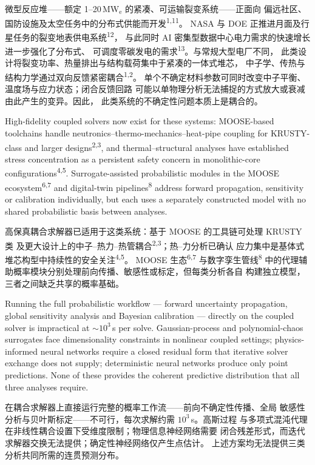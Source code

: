 \documentclass[11pt,a4paper]{article}
\begin{document}
微型反应堆——额定 1--20\,MW$_\mathrm{e}$ 的紧凑、可运输裂变系统——正面向
偏远社区、国防设施及太空任务中的分布式供能而开发\textsuperscript{1,11}。
NASA 与 DOE 正推进月面及行星任务的裂变地表供电系统\textsuperscript{12}，
与此同时 AI 密集型数据中心电力需求的快速增长进一步强化了分布式、
可调度零碳发电的需求\textsuperscript{13}。与常规大型电厂不同，
此类设计将裂变功率、热量排出与结构载荷集中于紧凑的一体式堆芯，
中子学、传热与结构力学通过双向反馈紧密耦合\textsuperscript{1,2}。
单个不确定材料参数可同时改变中子平衡、温度场与应力状态；闭合反馈回路
可能以单物理分析无法捕捉的方式放大或衰减由此产生的变异。因此，
此类系统的不确定性问题本质上是耦合的。

High-fidelity coupled solvers now exist for these systems: MOOSE-based
toolchains handle neutronics--thermo-mechanics--heat-pipe coupling for
KRUSTY-class and larger designs\textsuperscript{2,3}, and thermal--structural
analyses have established stress concentration as a persistent safety
concern in monolithic-core configurations\textsuperscript{4,5}.
Surrogate-assisted probabilistic modules in the MOOSE
ecosystem\textsuperscript{6,7} and digital-twin
pipelines\textsuperscript{8} address forward propagation, sensitivity or
calibration individually, but each uses a separately constructed model
with no shared probabilistic basis between analyses.

高保真耦合求解器已适用于这类系统：基于 MOOSE 的工具链可处理 KRUSTY 类
及更大设计上的中子--热力--热管耦合\textsuperscript{2,3}；热--力分析已确认
应力集中是基体式堆芯构型中持续性的安全关注\textsuperscript{4,5}。
MOOSE 生态\textsuperscript{6,7} 与数字孪生管线\textsuperscript{8}
中的代理辅助概率模块分别处理前向传播、敏感性或标定，但每类分析各自
构建独立模型，三者之间缺乏共享的概率基础。

Running the full probabilistic workflow --- forward uncertainty
propagation, global sensitivity analysis and Bayesian calibration ---
directly on the coupled solver is impractical at ${\sim}10^{3}$\,s per
solve. Gaussian-process and polynomial-chaos surrogates face
dimensionality constraints in nonlinear coupled settings;
physics-informed neural networks require a closed residual form that
iterative solver exchange does not supply; deterministic neural networks
produce only point predictions. None of these provides the coherent
predictive distribution that all three analyses require.

在耦合求解器上直接运行完整的概率工作流——前向不确定性传播、全局
敏感性分析与贝叶斯标定——不可行，每次求解约需 $10^{3}$\,s。高斯过程
与多项式混沌代理在非线性耦合设置下受维度限制；物理信息神经网络需要
闭合残差形式，而迭代求解器交换无法提供；确定性神经网络仅产生点估计。
上述方案均无法提供三类分析共同所需的连贯预测分布。
\end{document}
